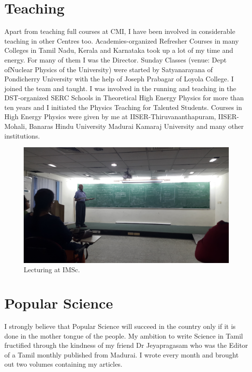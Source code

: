 \vspace{-\topsep}
\section*{Teaching}

Apart from teaching full courses at CMI, I have been involved in 
considerable teaching in other Centres too. Academies-organized 
Refresher Courses in many Colleges in Tamil Nadu, Kerala and Karnataka 
took up a lot of my time and energy. For many of them I was the 
Director. Sunday Classes (venue: Dept of\break Nuclear Physics of the 
University) were started by Satyanarayana of Pondicherry University with 
the help of Joseph Prabagar of Loyola College. I joined the team and 
taught. I was involved in the running and teaching in the DST-organized 
SERC Schools in Theoretical High Energy Physics for more than ten years 
and I initiated the Physics Teaching for Talented Students. Courses in 
High Energy Physics were given by me at IISER-Thiruvanantha\-puram, 
IISER-Mohali, Banaras Hindu University Madurai Kamaraj University and 
many other institutions.
\medskip

\begin{figure}[h]
\centering
\includegraphics[width=\textwidth]{images/rajaji-teach1.jpg}
\caption{Lecturing at IMSc.}
\end{figure}
\newpage

\section*{Popular Science}

I strongly believe that Popular Science will succeed in the country
only if it is done 
in the mother tongue of the people. My ambition to write Science in Tamil 
fructified through the kindness of my friend Dr Jeyapragasam who was the 
Editor of a Tamil monthly published from Madurai. I wrote every month 
and brought out two volumes containing my articles.
\bigskip

